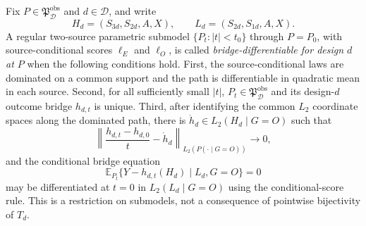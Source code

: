 Fix \(P\in\mathfrak P_{\mathcal D}^{\mathrm{obs}}\) and \(d\in\mathcal D\), and write
\[
 H_d=(S_{3d},S_{2d},A,X),\qquad L_d=(S_{2d},S_{1d},A,X).
\]
A regular two-source parametric submodel \(\{P_t:|t|<t_0\}\) through \(P=P_0\), with source-conditional scores \(\ell_E\) and \(\ell_O\), is called \emph{bridge-differentiable for design \(d\) at \(P\)} when the following conditions hold.  First, the source-conditional laws are dominated on a common support and the path is differentiable in quadratic mean in each source.  Second, for all sufficiently small \(|t|\), \(P_t\in\mathfrak P_{\mathcal D}^{\mathrm{obs}}\) and its design-\(d\) outcome bridge \(h_{d,t}\) is unique.  Third, after identifying the common \(L_2\) coordinate spaces along the dominated path, there is \(\dot h_d\in L_2(H_d\mid G=O)\) such that
\[
 \left\|\frac{h_{d,t}-h_{d,0}}{t}-\dot h_d\right\|_{L_2(P(\cdot\mid G=O))}\longrightarrow0,
\]
and the conditional bridge equation
\[
 \mathbb E_{P_t}\{Y-h_{d,t}(H_d)\mid L_d,G=O\}=0
\]
may be differentiated at \(t=0\) in \(L_2(L_d\mid G=O)\) using the conditional-score rule.  This is a restriction on submodels, not a consequence of pointwise bijectivity of \(T_d\).